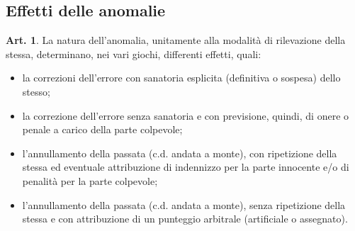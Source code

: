 \documentclass[italian,a4paper]{article}
\theoremstyle{definition}
\newtheorem{art}{Art.}
\newenvironment{packeditem}{
\begin{itemize}
  \setlength{\itemsep}{1pt}
  \setlength{\parskip}{0pt}
  \setlength{\parsep}{0pt}
}{\end{itemize}}
\begin{document}
\subsection{Effetti delle anomalie}
\begin{art}
    La natura dell'anomalia, unitamente alla modalità di rilevazione della stessa, determinano, nei vari giochi, differenti effetti, quali:
    \begin{packeditem}
\item      la correzioni dell'errore con sanatoria esplicita (definitiva o sospesa) dello stesso;
\item      la correzione dell'errore senza sanatoria e con previsione, quindi, di onere o penale a carico della parte colpevole;
\item      l'annullamento della passata (c.d. andata a monte), con ripetizione della stessa ed eventuale attribuzione di indennizzo per la parte innocente e/o di penalità per la parte colpevole;
\item      l'annullamento della passata (c.d. andata a monte), senza ripetizione della stessa e con attribuzione di un punteggio arbitrale (artificiale o assegnato).
    \end{packeditem}
\end{art}
\end{document}
